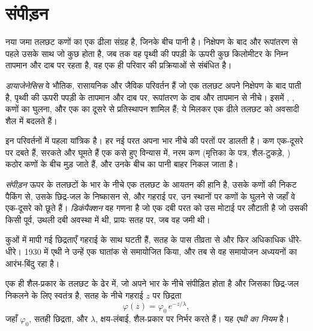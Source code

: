 \section{संपीड़न}\label{sec:b1:diagenesis-basins:compaction}

नया जमा तलछट कणों का एक ढीला संग्रह है, जिनके बीच पानी है। निक्षेपण के बाद और रूपांतरण से पहले उसके साथ जो कुछ होता है, जब तक वह पृथ्वी की पपड़ी के ऊपरी कुछ किलोमीटर के निम्न तापमान और दाब पर रहता है, वह एक ही परिवार की प्रक्रियाओं से संबंधित है।

\begin{definition}[डायाजेनेसिस]\label{def:b1:diagenesis-basins:diagenesis}
\emph{डायाजेनेसिस} वे भौतिक, रासायनिक और जैविक परिवर्तन हैं जो एक तलछट अपने निक्षेपण के बाद पाती है, पृथ्वी की ऊपरी पपड़ी के तापमान और दाब पर, रूपांतरण के दाब और तापमान से नीचे। इसमें , , कणों का घुलना, और एक  का दूसरे से प्रतिस्थापन शामिल हैं; ये मिलकर एक ढीले तलछट को अवसादी शैल में बदलते हैं।
\end{definition}

इन परिवर्तनों में पहला यांत्रिक है। हर नई परत अपना भार नीचे की परतों पर डालती है। कण एक-दूसरे पर दबते हैं, सरकते और घूमते हैं एक कसे हुए विन्यास में, नरम कण (मृत्तिका के पत्र, शैल-टुकड़े, ) कठोर कणों के बीच मुड़ जाते हैं, और उनके बीच का पानी बाहर निकल जाता है।

\begin{definition}[संपीड़न, डिकंपैक्शन]\label{def:b1:diagenesis-basins:compaction}
\emph{संपीड़न} ऊपर के तलछटों के भार के नीचे एक तलछट के आयतन की हानि है, उसके कणों की निकट पैकिंग से, उसके छिद्र-जल के निष्कासन से, और गहराई पर, उन स्थानों पर कणों के घुलने से जहाँ वे एक-दूसरे को छूते हैं। \emph{डिकंपैक्शन} वह गणना है जो एक दबी परत को उस मोटाई पर लौटाती है जो उसकी किसी पूर्व, उथली दबी अवस्था में थी, प्रायः सतह पर, जब वह जमी थी।
\end{definition}

कुओं में मापी गई छिद्रताएँ गहराई के साथ घटती हैं, सतह के पास तीव्रता से और फिर अधिकाधिक धीरे-धीरे। 1930 में एथी ने उन्हें एक घातांक से समायोजित किया, और तब से वह समायोजन  अध्ययनों का आरंभ-बिंदु रहा है।

\begin{proposition}[एथी का नियम]\label{prop:b1:diagenesis-basins:athy}
एक ही शैल-प्रकार के तलछट के ढेर में, जो अपने भार के नीचे संपीड़ित होता है और जिसका छिद्र-जल निकलने के लिए स्वतंत्र है, सतह के नीचे गहराई $z$ पर छिद्रता
\[
  \varphi(z) = \varphi_0\, e^{-z/\lambda},
\]
जहाँ $\varphi_0$, सतही छिद्रता, और $\lambda$, क्षय-लंबाई, शैल-प्रकार पर निर्भर करते हैं। यह \emph{एथी का नियम} है।
\end{proposition}
\admitted

